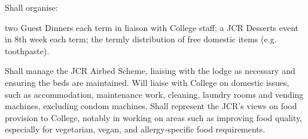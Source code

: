 Shall organise:\begin{enumerate}
two Guest Dinners each term in liaison with College staff;
a JCR Desserts event in 8th week each term;
the termly distribution of free domestic items (e.g. toothpaste).\end{enumerate}
Shall manage the JCR Airbed Scheme, liaising with the lodge as necessary and ensuring the beds are maintained.
Will liaise with College on domestic issues, such as accommodation, maintenance work, cleaning, laundry rooms and vending machines, excluding condom machines.
Shall represent the JCR's views on food provision to College, notably in working on areas such as improving food quality, especially for vegetarian, vegan, and allergy-specific food requirements.
